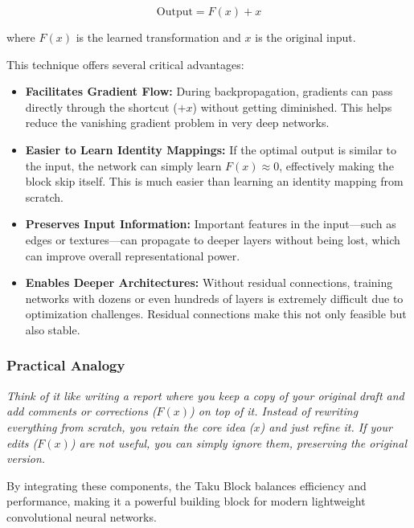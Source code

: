 \begin{itemize}
\[
\text{Output} = F(x) + x
\]

where \( F(x) \) is the learned transformation and \( x \) is the original input.

This technique offers several critical advantages:

\begin{itemize}
  \item \textbf{Facilitates Gradient Flow:} During backpropagation, gradients can pass directly through the shortcut (\(+x\)) without getting diminished. This helps reduce the vanishing gradient problem in very deep networks.
  
  \item \textbf{Easier to Learn Identity Mappings:} If the optimal output is similar to the input, the network can simply learn \( F(x) \approx 0 \), effectively making the block skip itself. This is much easier than learning an identity mapping from scratch.
  
  \item \textbf{Preserves Input Information:} Important features in the input—such as edges or textures—can propagate to deeper layers without being lost, which can improve overall representational power.
  
  \item \textbf{Enables Deeper Architectures:} Without residual connections, training networks with dozens or even hundreds of layers is extremely difficult due to optimization challenges. Residual connections make this not only feasible but also stable.
\end{itemize}

\subsubsection*{Practical Analogy}
\textit{Think of it like writing a report where you keep a copy of your original draft and add comments or corrections (\( F(x) \)) on top of it. Instead of rewriting everything from scratch, you retain the core idea (\( x \)) and just refine it. If your edits (\( F(x) \)) are not useful, you can simply ignore them, preserving the original version.}
\end{itemize}

By integrating these components, the Taku Block balances efficiency and performance, making it a powerful building block for modern lightweight convolutional neural networks.

